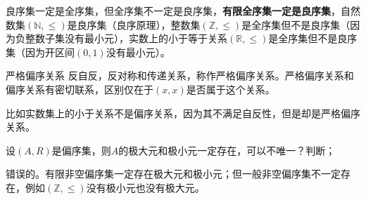 良序集一定是全序集，但全序集不一定是良序集，\textbf{有限全序集一定是良序集}，自然数集$(\mathbb{N}, \leq)$是良序集（良序原理），整数集$(\mathbb{Z}, \leq)$是全序集但不是良序集（因为负整数子集没有最小元），实数上的小于等于关系$(\mathbb{R}, \leq)$是全序集但不是良序集（因为开区间$(0,1)$没有最小元）。
\begin{definition}{严格偏序关系}{}
    反自反，反对称和传递关系，称作严格偏序关系。严格偏序关系和偏序关系有密切联系，区别仅在于$(x,x)$是否属于这个关系。
\end{definition}
比如实数集上的小于关系不是偏序关系，因为其不满足自反性，但是却是严格偏序关系。
\begin{example}{}{}
设$(A,R)$是偏序集，则$A$的极大元和极小元一定存在，可以不唯一？判断；
\end{example}
错误的。有限非空偏序集一定存在极大元和极小元；但一般非空偏序集不一定存在，例如$(\mathbb{Z},\leqslant)$没有极小元也没有极大元。
